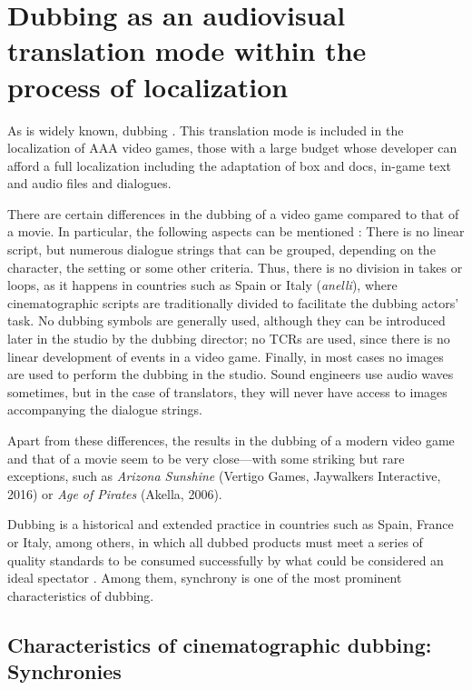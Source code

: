 \documentclass[output=paper]{langsci/langscibook}
\begin{document}
\section{Dubbing as an audiovisual translation mode within the process of localization}

As is widely known, dubbing . This translation mode is included in the localization of AAA video games, those with a large budget whose developer can afford a full localization including the adaptation of box and docs, in-game text and audio files and dialogues. 

There are certain differences in the dubbing of a video game compared to that of a movie. In particular, the following aspects can be mentioned \parencite{mejias19}: There is no linear script, but numerous dialogue strings that can be grouped, depending on the character, the setting or some other criteria. Thus, there is no division in takes or loops, as it happens in countries such as Spain or Italy (\textit{anelli}), where cinematographic scripts are traditionally divided to facilitate the dubbing actors’ task. No dubbing symbols are generally used, although they can be introduced later in the studio by the dubbing director; no TCRs are used, since there is no linear development of events in a video game. Finally, in most cases no images are used to perform the dubbing in the studio. Sound engineers use audio waves sometimes, but in the case of translators, they will never have access to images accompanying the dialogue strings.

Apart from these differences, the results in the dubbing of a modern video game and that of a movie seem to be very close—with some striking but rare exceptions, such as \textit{Arizona Sunshine} (Vertigo Games, Jaywalkers Interactive, 2016) or \textit{Age of Pirates} (Akella, 2006).

Dubbing is a historical and extended practice in countries such as Spain, France or Italy, among others, in which all dubbed products must meet a series of quality standards to be consumed successfully by what could be considered an ideal spectator \parencite{chaume07}. Among them, synchrony is one of the most prominent characteristics of dubbing.

\subsection{Characteristics of cinematographic dubbing: Synchronies}\label{lmc:syn}
\end{document}
